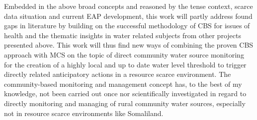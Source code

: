 Embedded in the above broad concepts and reasoned by the tense context, scarce data situation and current EAP development, this work will partly address found gaps in literature by building on the successful methodology of CBS for issues of health and the thematic insights in water related subjects from other projects presented above. This work will thus find new ways of combining the proven CBS approach with MCS on the topic of direct community water source monitoring for the creation of a highly local and up to date water level threshold to trigger directly related anticipatory actions in a resource scarce environment.
The community-based monitoring and management concept has, to the best of my knowledge, not been carried out once nor scientifically investigated in regard to directly monitoring and managing of rural community water sources, especially not in resource scarce environments like Somaliland.
